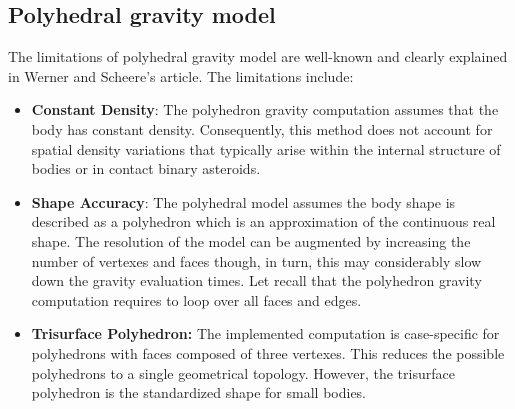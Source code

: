 \subsection{Polyhedral gravity model}
The limitations of polyhedral gravity model are well-known and clearly explained in Werner and Scheere's article\cite{werner1996}. The limitations include:
\begin{itemize}
	\item \textbf{Constant Density}: The polyhedron gravity computation assumes that the body has constant density. Consequently, this method does not account for spatial density variations that typically arise within the internal structure of bodies or in contact binary asteroids.
	\item \textbf{Shape Accuracy}: The polyhedral model assumes the body shape is described as a polyhedron which is an approximation of the continuous real shape. The resolution of the model can be augmented by increasing the number of vertexes and faces though, in turn, this may considerably slow down the gravity evaluation times. Let recall that the polyhedron gravity computation requires to loop over all faces and edges.
	\item \textbf{Trisurface Polyhedron:} The implemented computation is case-specific for polyhedrons with faces composed of three vertexes. This reduces the possible polyhedrons to a single geometrical topology. However, the trisurface polyhedron is the standardized shape for small bodies.
\end{itemize}
